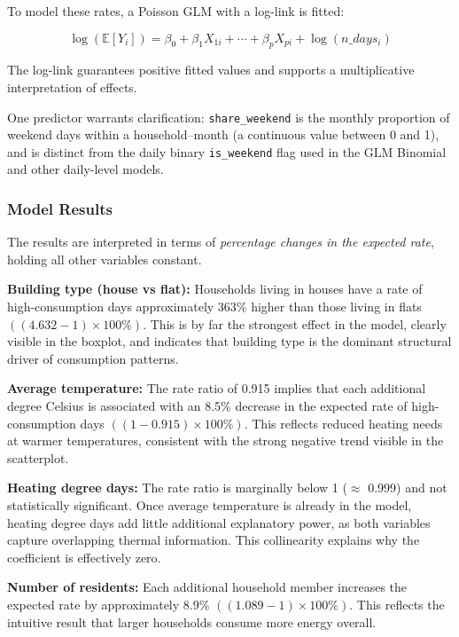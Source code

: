 \documentclass[
]{article}
\begin{document}
To model these rates, a Poisson GLM with a log-link is fitted:

\[
\log(\mathbb{E}[Y_i]) = \beta_0 + \beta_1 X_{1i} + \cdots + \beta_p X_{pi} + \log(n\_days_i)
\]

The log-link guarantees positive fitted values and supports a
multiplicative interpretation of effects.

One predictor warrants clarification: \texttt{share\_weekend} is the
monthly proportion of weekend days within a household--month (a
continuous value between 0 and 1), and is distinct from the daily binary
\texttt{is\_weekend} flag used in the GLM Binomial and other daily-level
models.

\subsubsection{Model Results}\label{model-results-1}

The results are interpreted in terms of \emph{percentage changes in the
expected rate}, holding all other variables constant.

\textbf{Building type (house vs flat):} Households living in houses have
a rate of high-consumption days approximately 363\% higher than those
living in flats \(((4.632 - 1) \times 100\%)\). This is by far the
strongest effect in the model, clearly visible in the boxplot, and
indicates that building type is the dominant structural driver of
consumption patterns.

\textbf{Average temperature:} The rate ratio of 0.915 implies that each
additional degree Celsius is associated with an 8.5\% decrease in the
expected rate of high- consumption days \(((1 - 0.915) \times 100\%)\).
This reflects reduced heating needs at warmer temperatures, consistent
with the strong negative trend visible in the scatterplot.

\textbf{Heating degree days:} The rate ratio is marginally below 1
(\(\approx\) 0.999) and not statistically significant. Once average
temperature is already in the model, heating degree days add little
additional explanatory power, as both variables capture overlapping
thermal information. This collinearity explains why the coefficient is
effectively zero.

\textbf{Number of residents:} Each additional household member increases
the expected rate by approximately 8.9\% \(((1.089 - 1) \times 100\%)\).
This reflects the intuitive result that larger households consume more
energy overall.
\end{document}
